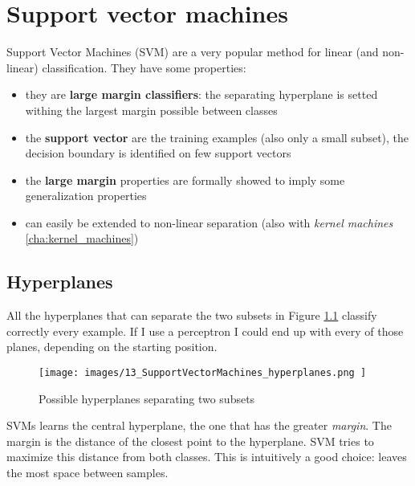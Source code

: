 \chapter{Support vector machines}
\label{cha:SVMs}

Support Vector Machines (SVM) are a very popular method for linear (and non-linear)
classification. They have some properties:
\begin{itemize}
	\item they are \textbf{large margin classifiers}: the separating hyperplane is
		setted withing the largest margin possible between classes

	\item the \textbf{support vector} are the training examples (also only a small
		subset), the decision boundary is identified on few support vectors

	\item the \textbf{large margin} properties are formally showed to imply some
		generalization properties

	\item can easily be extended to non-linear separation (also with \textit{kernel
		machines} \ref{cha:kernel_machines})
\end{itemize}

\section{Hyperplanes}
All the hyperplanes that can separate the two subsets in Figure \ref{fig:hyperplanesSVMs}
classify correctly every example. If I use a perceptron I could end up with
every of those planes, depending on the starting position.
\begin{figure}[H]
	\centering
	\texttt{[image: 
        images/13\_SupportVectorMachines\_hyperplanes.png
    ]}
	\caption{Possible hyperplanes separating two subsets}
	\label{fig:hyperplanesSVMs}
\end{figure}
SVMs learns the central hyperplane, the one that has the greater \textit{margin}.
The margin is the distance of the closest point to the hyperplane. SVM tries to
maximize this distance from both classes. This is intuitively a good choice:
leaves the most space between samples.


